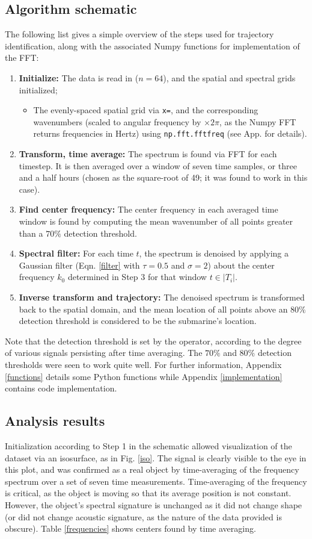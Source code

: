 \documentclass{article}
\begin{document}
\subsection{Algorithm schematic}
The following list gives a simple overview of the steps used for trajectory identification, along with the associated Numpy functions for implementation of the FFT:
\begin{enumerate}
\item \textbf{Initialize:} The data is read in ($n=64$), and the spatial and spectral grids initialized;
  \begin{itemize}
  \item The evenly-spaced spatial grid via \texttt{x=}, and the corresponding wavenumbers (scaled to angular frequency by $\times 2\pi$, as the Numpy FFT returns frequencies in Hertz) using \texttt{np.fft.fftfreq} (see App.  for details).
  \end{itemize}
\item \textbf{Transform, time average:} The spectrum is found via FFT for each timestep. It is then averaged over a window of seven time samples, or three and a half hours (chosen as the square-root of 49; it was found to work in this case).
\item \textbf{Find center frequency:} The center frequency in each averaged time window is found by computing the mean wavenumber of all points greater than a $70\%$ detection threshold.
\item \textbf{Spectral filter:} For each time $t$, the spectrum is denoised by applying a Gaussian filter (Eqn. \ref{filter} with $\tau = 0.5$ and $\sigma=2$) about the center frequency $k_{0}$ determined in Step 3 for that window $t\in|T_i|$.
\item \textbf{Inverse transform and trajectory:} The denoised spectrum is transformed back to the spatial domain, and the mean location of all points above an $80\%$ detection threshold is considered to be the submarine's location.
\end{enumerate}
Note that the detection threshold is set by the operator, according to the degree of various signals persisting after time averaging. The $70\%$ and $80\%$ detection thresholds were seen to work quite well. For further information, Appendix \ref{functions} details some Python functions while Appendix \ref{implementation} contains code implementation.

\subsection{Analysis results}
Initialization according to Step 1 in the schematic allowed visualization of the dataset via an isosurface, as in Fig. \ref{iso}. The signal is clearly visible to the eye in this plot, and was confirmed as a real object by time-averaging of the frequency spectrum over a set of seven time measurements. Time-averaging of the frequency is critical, as the object is moving so that its average position is not constant. However, the object's spectral signature is unchanged as it did not change shape (or did not change acoustic signature, as the nature of the data provided is obscure). Table \ref{frequencies} shows centers found by time averaging.
\end{document}
